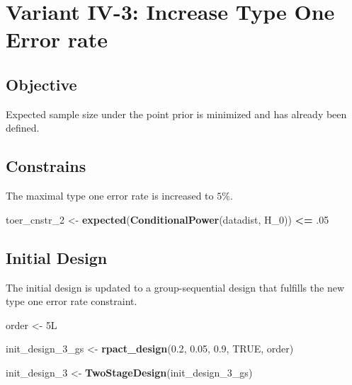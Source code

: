\documentclass[]{book}
\newenvironment{Shaded}{\begin{snugshade}}{\end{snugshade}}
\newcommand{\DecValTok}[1]{\textcolor[rgb]{0.00,0.00,0.81}{#1}}
\newcommand{\FloatTok}[1]{\textcolor[rgb]{0.00,0.00,0.81}{#1}}
\newcommand{\KeywordTok}[1]{\textcolor[rgb]{0.13,0.29,0.53}{\textbf{#1}}}
\newcommand{\NormalTok}[1]{#1}
\newcommand{\OperatorTok}[1]{\textcolor[rgb]{0.81,0.36,0.00}{\textbf{#1}}}
\newcommand{\OtherTok}[1]{\textcolor[rgb]{0.56,0.35,0.01}{#1}}
\newcommand{\StringTok}[1]{\textcolor[rgb]{0.31,0.60,0.02}{#1}}
\begin{document}
\hypertarget{variantIV_3}{%
\section{Variant IV-3: Increase Type One Error rate}\label{variantIV_3}}

\hypertarget{objective-9}{%
\subsection{Objective}\label{objective-9}}

Expected sample size under the point prior is minimized and has already been
defined.

\hypertarget{constrains-9}{%
\subsection{Constrains}\label{constrains-9}}

The maximal type one error rate is increased to \(5\%\).

\begin{Shaded}
\begin{Highlighting}[]
\NormalTok{toer_cnstr_}\DecValTok{2}\NormalTok{ <-}\StringTok{ }\KeywordTok{expected}\NormalTok{(}\KeywordTok{ConditionalPower}\NormalTok{(datadist, H_}\DecValTok{0}\NormalTok{)) }\OperatorTok{<=}\StringTok{ }\FloatTok{.05}
\end{Highlighting}
\end{Shaded}

\hypertarget{initial-design-8}{%
\subsection{Initial Design}\label{initial-design-8}}

The initial design is updated to a group-sequential design that fulfills
the new type one error rate constraint.

\begin{Shaded}
\begin{Highlighting}[]
\NormalTok{order <-}\StringTok{ }\NormalTok{5L }

\NormalTok{init_design_}\DecValTok{3}\NormalTok{_gs <-}\StringTok{ }\KeywordTok{rpact_design}\NormalTok{(}\FloatTok{0.2}\NormalTok{, }\FloatTok{0.05}\NormalTok{, }\FloatTok{0.9}\NormalTok{, }\OtherTok{TRUE}\NormalTok{, order)}

\NormalTok{init_design_}\DecValTok{3}\NormalTok{    <-}\StringTok{ }\KeywordTok{TwoStageDesign}\NormalTok{(init_design_}\DecValTok{3}\NormalTok{_gs)}
\end{Highlighting}
\end{Shaded}
\end{document}
